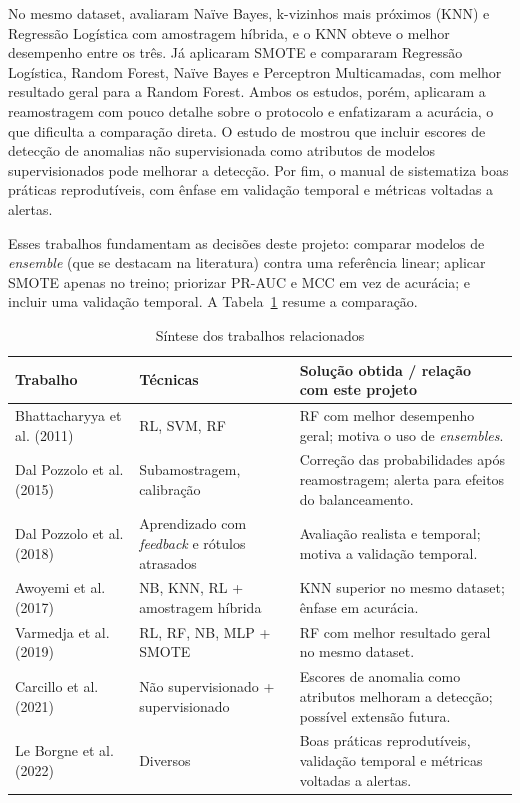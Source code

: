 \documentclass[12pt]{article}
\begin{document}
No mesmo dataset, \cite{awoyemi:2017} avaliaram Naïve
Bayes, k-vizinhos mais próximos (KNN) e Regressão Logística com amostragem
híbrida, e o KNN obteve o melhor desempenho entre os três.
Já \cite{varmedja:2019} aplicaram SMOTE e compararam
Regressão Logística, Random Forest, Naïve Bayes e Perceptron Multicamadas, com
melhor resultado geral para a Random Forest. Ambos os estudos, porém,
aplicaram a reamostragem com pouco detalhe sobre o protocolo e enfatizaram a
acurácia, o que dificulta a comparação direta.
O estudo de \cite{carcillo:2021} mostrou que incluir escores de
detecção de anomalias não supervisionada como atributos de modelos
supervisionados pode melhorar a detecção. Por fim, o manual de
\cite{leborgne:2022} sistematiza boas práticas
reprodutíveis, com ênfase em validação temporal e métricas voltadas a alertas.

Esses trabalhos fundamentam as decisões deste projeto: comparar modelos de
\emph{ensemble} (que se destacam na literatura) contra uma referência linear;
aplicar SMOTE apenas no treino; priorizar PR-AUC e MCC em vez de acurácia; e
incluir uma validação temporal. A Tabela~\ref{tab:relacionados} resume a
comparação.

\begin{table}[ht]
\centering
\caption{Síntese dos trabalhos relacionados}
\label{tab:relacionados}
\footnotesize
\begin{tabularx}{\textwidth}{@{}>{\raggedright\arraybackslash}p{3.3cm}>{\raggedright\arraybackslash}p{3.2cm}X@{}}
\toprule
\textbf{Trabalho} & \textbf{Técnicas} & \textbf{Solução obtida / relação com este projeto} \\
\midrule
Bhattacharyya et al. (2011) & RL, SVM, RF & RF com melhor desempenho geral; motiva o uso de \emph{ensembles}. \\
Dal Pozzolo et al. (2015) & Subamostragem, calibração & Correção das probabilidades após reamostragem; alerta para efeitos do balanceamento. \\
Dal Pozzolo et al. (2018) & Aprendizado com \emph{feedback} e rótulos atrasados & Avaliação realista e temporal; motiva a validação temporal. \\
Awoyemi et al. (2017) & NB, KNN, RL + amostragem híbrida & KNN superior no mesmo dataset; ênfase em acurácia. \\
Varmedja et al. (2019) & RL, RF, NB, MLP + SMOTE & RF com melhor resultado geral no mesmo dataset. \\
Carcillo et al. (2021) & Não supervisionado + supervisionado & Escores de anomalia como atributos melhoram a detecção; possível extensão futura. \\
Le Borgne et al. (2022) & Diversos & Boas práticas reprodutíveis, validação temporal e métricas voltadas a alertas. \\
\bottomrule
\end{tabularx}
\end{table}
\end{document}
